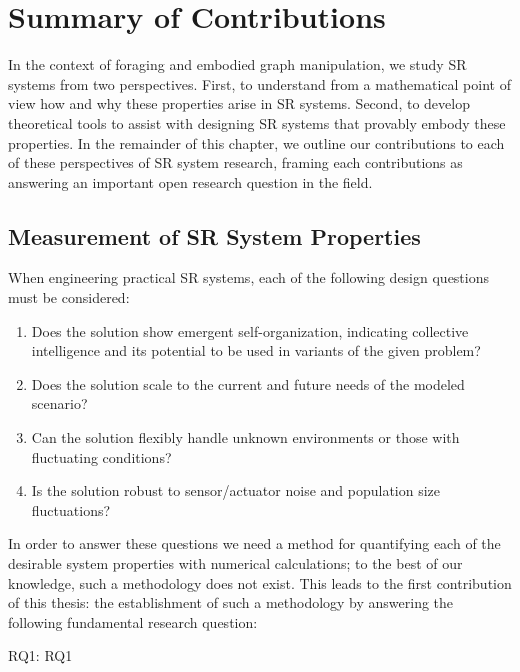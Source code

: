 \section{Summary of Contributions}
%
In the context of foraging and embodied graph manipulation, we study SR
systems from two perspectives. First, to understand from a mathematical point of
view how and why these properties arise in SR systems. Second, to develop
theoretical tools to assist with designing SR systems that provably
embody these properties.  In the remainder of this chapter, we outline our
contributions to each of these perspectives of SR system research,
framing each contributions as answering an important open research question in
the field.

\subsection{Measurement of SR System Properties }
%
When engineering practical SR systems, each of the following design
questions must be considered:
%
\begin{enumerate}
\item {Does the solution show emergent self-organization, indicating collective
    intelligence and its potential to be used in variants of the given problem?
  }
\item{Does the solution scale to the current and future needs of the modeled
    scenario?}
\item {Can the solution flexibly handle unknown environments or those with
    fluctuating conditions?}

\item {Is the solution robust to sensor/actuator noise and population size
    fluctuations?
  }
\end{enumerate}
%
In order to answer these questions we need a method for quantifying
each of the desirable system properties with numerical calculations; to the best
of our knowledge, such a methodology does not exist. This leads to the first
contribution of this thesis: the establishment of such a methodology by
answering the following fundamental research question:

\medskip\noindent
\gls{RQ1}: \glsdesc{RQ1}
\medskip

